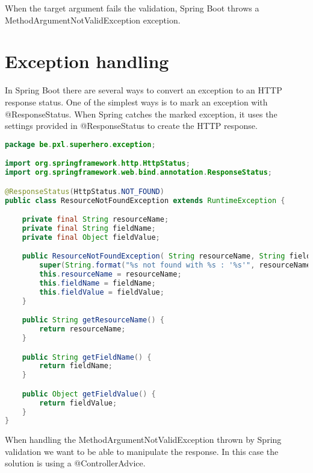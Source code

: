When the target argument fails the validation, Spring Boot throws a MethodArgumentNotValidException exception.

\section{Exception handling}

In Spring Boot there are several ways to convert an exception to an HTTP response status.
One of the simplest ways is to mark an exception with @ResponseStatus. 
When Spring catches the marked exception, it uses the settings provided in @ResponseStatus to create the HTTP response.

\begin{lstlisting}[language=java, frame=single]
package be.pxl.superhero.exception;

import org.springframework.http.HttpStatus;
import org.springframework.web.bind.annotation.ResponseStatus;

@ResponseStatus(HttpStatus.NOT_FOUND)
public class ResourceNotFoundException extends RuntimeException {

	private final String resourceName;
    private final String fieldName;
    private final Object fieldValue;

    public ResourceNotFoundException( String resourceName, String fieldName, Object fieldValue) {
        super(String.format("%s not found with %s : '%s'", resourceName, fieldName, fieldValue));
        this.resourceName = resourceName;
        this.fieldName = fieldName;
        this.fieldValue = fieldValue;
    }

    public String getResourceName() {
        return resourceName;
    }

    public String getFieldName() {
        return fieldName;
    }

    public Object getFieldValue() {
        return fieldValue;
    }
}
\end{lstlisting}

When handling the MethodArgumentNotValidException thrown by Spring validation we want to be able to manipulate the response.
In this case the solution is using a @ControllerAdvice.

